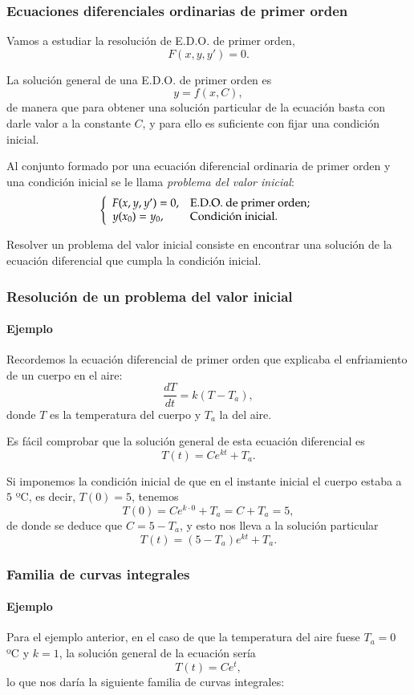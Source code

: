 \begin{frame}
	\frametitle{Ecuaciones diferenciales ordinarias de primer orden}
	Vamos a estudiar la resolución de E.D.O. de primer orden, 
	\[
		F(x,y,y')=0.
	\]
		
	La solución general de una E.D.O. de primer orden es
	\[
		y = f (x,C),
	\]
	de manera que para obtener una solución particular de la ecuación basta con darle valor a la constante $C$, y para ello es suficiente con fijar una condición inicial.
		
	\begin{definicion}
		Al conjunto formado por una ecuación diferencial ordinaria de primer orden y una condición inicial se le llama \emph{problema del valor inicial}:
		\[
			\left\{%
			\begin{array}{ll}
				F(x,y,y')=0, & \hbox{E.D.O. de primer orden;} \\
				y(x_0)=y_0,  & \hbox{Condición inicial.}     \\
			\end{array}%
			\right.    
		\]
	\end{definicion}
		
	Resolver un problema del valor inicial consiste en encontrar una solución de la ecuación diferencial que cumpla la condición inicial.
\end{frame}


\begin{frame}
	\frametitle{Resolución de un problema del valor inicial}
	\framesubtitle{Ejemplo}
	Recordemos la ecuación diferencial de primer orden que explicaba el enfriamiento de un cuerpo en el aire:
	\[
		\frac{dT}{dt}=k(T-T_a),
	\]
	donde $T$ es la temperatura del cuerpo y $T_a$ la del aire.
		
	Es fácil comprobar que la solución general de esta ecuación diferencial es 
	\[T(t) = Ce^{kt}+T_a.\]
		
	Si imponemos la condición inicial de que en el instante inicial el cuerpo estaba a $5$ ºC, es decir, $T(0)=5$, tenemos 
	\[T(0) = Ce^{k\cdot0}+T_a = C+T_a = 5,\]
	de donde se deduce que $C=5-T_a$, y esto nos lleva a la solución particular 
	\[
		T(t) = (5-T_a)e^{kt}+T_a.
	\]
\end{frame}


\begin{frame}
	\frametitle{Familia de curvas integrales}
	\framesubtitle{Ejemplo}
	Para el ejemplo anterior, en el caso de que la temperatura del aire fuese $T_a=0$ ºC y $k=1$, la solución general de la ecuación sería 
	\[T(t)=Ce^t,\]
	lo que nos daría la siguiente familia de curvas integrales:
	\begin{center}
		\scalebox{0.95}{}
	\end{center}
\end{frame}


